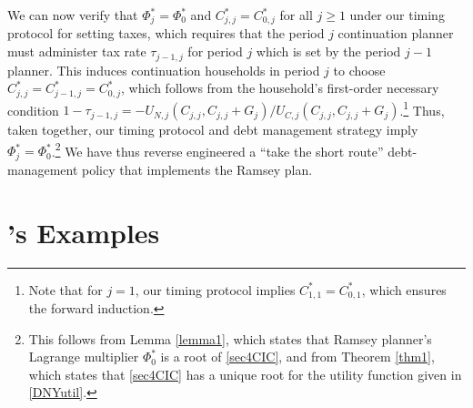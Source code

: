 \documentclass[12pt]{article}
\begin{document}
We can now verify that   $\Phi_j^*=\Phi_0^*$ and $C_{j, j}^*=C_{0, j}^*$ for all $j \geq 1$ under our timing protocol for setting taxes, which requires that 
the period $j$ continuation planner must administer tax rate $\tau_{j-1, j}$ for period $j$ which is set by the period $j-1$ planner. This induces continuation households in period $j$ to  choose $C_{j, j}^*=C_{j-1, j}^*=C_{0, j}^*$, which follows from the household's first-order necessary condition $1-\tau_{j-1, j}=-U_{N, j}(C_{j, j}, C_{j, j}+G_j)/U_{C, j}(C_{j, j}, C_{j, j}+G_j)$.\footnote{Note that for $j=1$, our timing protocol implies $C_{1, 1}^*=C_{0, 1}^*$, which ensures the forward induction.}  Thus, taken together, our  timing protocol and debt management strategy
imply $\Phi_j^*=\Phi_0^*$.\footnote{This  follows from Lemma \ref{lemma1}, which states that  Ramsey planner's Lagrange multiplier $\Phi_0^*$ is a root of  \eqref{sec4CIC}, and from Theorem \ref{thm1}, which states that \eqref{sec4CIC} has a unique root for the utility function given in \eqref{DNYutil}.} 
We have thus reverse engineered a ``take the short route''  debt-management policy that implements the Ramsey plan.


\section{%
\citeauthor{debortoli2021optimal}'s Examples \label{sec:DNYexamples}} %
\end{document}
